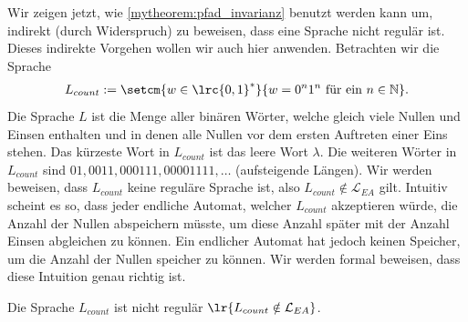 Wir zeigen jetzt, wie \cref{mytheorem:pfad_invarianz} benutzt werden kann um, indirekt (durch Widerspruch) zu beweisen, dass eine Sprache nicht regulär ist. Dieses indirekte Vorgehen wollen wir auch hier anwenden. Betrachten wir die Sprache
\begin{align*}
	L_{count} := \setcm{w\in \lrc{0,1}^*}{w = 0^n 1^n\text{ für ein } n\in\mathbb{N}}.
\end{align*}
Die Sprache $L$ ist die Menge aller binären Wörter, welche gleich viele Nullen und Einsen enthalten und in denen alle Nullen vor dem ersten Auftreten einer Eins stehen. Das kürzeste Wort in $L_{count}$ ist das leere Wort $\lambda$. Die weiteren Wörter in $L_{count}$ sind $01, 0011, 000111, 00001111, \ldots $ (aufsteigende Längen). Wir werden beweisen, dass $L_{count}$ keine reguläre Sprache ist, also $L_{count}\notin \mathcal{L}_{EA}$ gilt. Intuitiv scheint es so, dass jeder endliche Automat, welcher $L_{count}$ akzeptieren würde, die Anzahl der Nullen abspeichern müsste, um diese Anzahl später mit der Anzahl Einsen abgleichen zu können. Ein endlicher Automat hat jedoch keinen Speicher, um die Anzahl der Nullen speicher zu können. Wir werden formal beweisen, dass diese Intuition genau richtig ist.

\begin{mytheorem}\label{mytheorem:Lcount}
Die Sprache $L_{count}$ ist nicht regulär $\lr{L_{count}\notin \mathcal{L}_{EA}}$.
\end{mytheorem}


